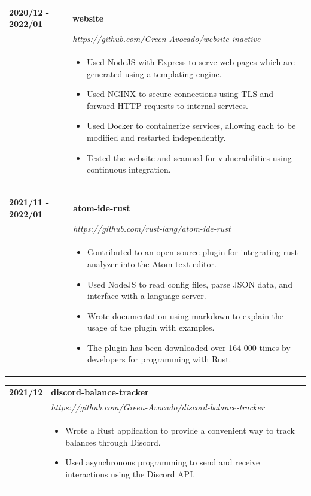 \documentclass[letterpaper]{article}
\begin{document}
        \begin{tabular}{p{} p{}}
            \textbf{2020/12 - 2022/01} & \textbf{website} \\
            & \emph{https://github.com/Green-Avocado/website-inactive} \\
            & \begin{itemize}
                \item Used NodeJS with Express to serve web pages which are generated using a templating
                    engine.
                \item Used NGINX to secure connections using TLS and forward HTTP requests to internal
                    services.
                \item Used Docker to containerize services, allowing each to be modified and restarted
                    independently.
                \item Tested the website and scanned for vulnerabilities using continuous integration.
            \end{itemize}
        \end{tabular}

        \begin{tabular}{p{} p{}}
            \textbf{2021/11 - 2022/01} & \textbf{atom-ide-rust} \\
            & \emph{https://github.com/rust-lang/atom-ide-rust} \\
            & \begin{itemize}
                \item Contributed to an open source plugin for integrating rust-analyzer into the Atom
                    text editor.
                \item Used NodeJS to read config files, parse JSON data, and interface with a language
                    server.
                \item Wrote documentation using markdown to explain the usage of the plugin with examples.
                \item The plugin has been downloaded over 164 000 times by developers for programming with
                    Rust.
            \end{itemize}
        \end{tabular}

        \begin{tabular}{p{} p{}}
            \textbf{2021/12} & \textbf{discord-balance-tracker} \\
            & \emph{https://github.com/Green-Avocado/discord-balance-tracker} \\
            & \begin{itemize}
                \item Wrote a Rust application to provide a convenient way to track balances through
                    Discord.
                \item Used asynchronous programming to send and receive interactions using the Discord
                    API.
            \end{itemize}
        \end{tabular}
\end{document}
